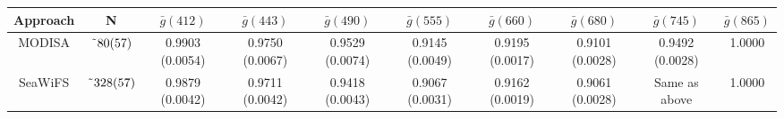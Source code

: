 \documentclass[preview]{standalone}
\begin{document}
\begin{threeparttable}

\centering
\begin{tabular}{cccccccccc} 
 \hline 
Approach & N\tnote{\it a}			  & $\bar{g}(412)$ 	 			& $\bar{g}(443)$ 	  			& $\bar{g}(490)$    			& $\bar{g}(555)$    			& $\bar{g}(660)$    						& $\bar{g}(680)$    						& $\bar{g}(745)$    			& $\bar{g}(865)$    \\ \hline
MODISA\tnote{\it b}& $\char`\~80(57)$ & 0.9903 (0.0054) & 0.9750 (0.0067) & 0.9529 (0.0074) & 0.9145 (0.0049) & 0.9195 (0.0017) & 0.9101 (0.0028) &  0.9492 (0.0028) 	& 1.0000 \\%
SeaWiFS\tnote{\it b}& $\char`\~328(57)$ &  0.9879 (0.0042) & 0.9711 (0.0042) & 0.9418 (0.0043) & 0.9067 (0.0031) & 0.9162 (0.0019)\tnote{\it c} & 0.9061 (0.0028)\tnote{\it c} & Same as above   & 1.0000 \\%

\end{tabular}
\end{threeparttable}
\end{document}
